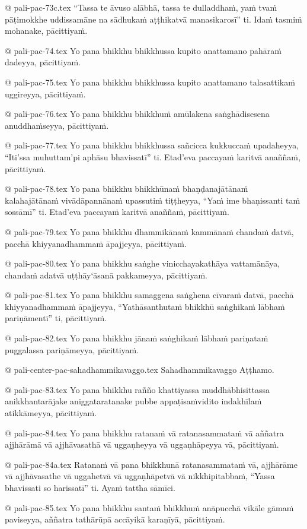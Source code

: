 @ pali-pac-73c.tex
“Tassa te āvuso alābhā, tassa te dulladdhaṁ, yaṁ tvaṁ pāṭimokkhe uddissamāne na sādhukaṁ aṭṭhikatvā manasikarosī” ti. Idaṁ tasmiṁ mohanake, pācittiyaṁ.

@ pali-pac-74.tex
Yo pana bhikkhu bhikkhussa kupito anattamano pahāraṁ dadeyya, pācittiyaṁ.

@ pali-pac-75.tex
Yo pana bhikkhu bhikkhussa kupito anattamano talasattikaṁ uggireyya, pācittiyaṁ.

@ pali-pac-76.tex
Yo pana bhikkhu bhikkhuṁ amūlakena saṅghādisesena anuddhaṁseyya, pācittiyaṁ.

@ pali-pac-77.tex
Yo pana bhikkhu bhikkhussa sañcicca kukkuccaṁ upadaheyya, “Iti’ssa muhuttam’pi aphāsu bhavissatī” ti. Etad’eva paccayaṁ karitvā anaññaṁ, pācittiyaṁ.

@ pali-pac-78.tex
Yo pana bhikkhu bhikkhūnaṁ bhaṇḍanajātānaṁ kalahajātānaṁ vivādāpannānaṁ upassutiṁ tiṭṭheyya, “Yaṁ ime bhaṇissanti taṁ sossāmī” ti. Etad’eva paccayaṁ karitvā anaññaṁ, pācittiyaṁ.

@ pali-pac-79.tex
Yo pana bhikkhu dhammikānaṁ kammānaṁ chandaṁ datvā, pacchā khiyyanadhammaṁ āpajjeyya, pācittiyaṁ.

@ pali-pac-80.tex
Yo pana bhikkhu saṅghe vinicchayakathāya vattamānāya, chandaṁ adatvā uṭṭhāy‘āsanā pakkameyya, pācittiyaṁ.

@ pali-pac-81.tex
Yo pana bhikkhu samaggena saṅghena cīvaraṁ datvā, pacchā khiyyanadhammaṁ āpajjeyya, “Yathāsanthutaṁ bhikkhū saṅghikaṁ lābhaṁ pariṇāmentī” ti, pācittiyaṁ.

@ pali-pac-82.tex
Yo pana bhikkhu jānaṁ saṅghikaṁ lābhaṁ pariṇataṁ puggalassa pariṇāmeyya, pācittiyaṁ.

@ pali-center-pac-sahadhammikavaggo.tex
Sahadhammikavaggo Aṭṭhamo.

@ pali-pac-83.tex
Yo pana bhikkhu rañño khattiyassa muddhābhisittassa anikkhantarājake aniggataratanake pubbe appaṭisaṁvidito indakhīlaṁ atikkāmeyya, pācittiyaṁ.

@ pali-pac-84.tex
Yo pana bhikkhu ratanaṁ vā ratanasammataṁ vā aññatra ajjhārāmā vā ajjhāvasathā vā uggaṇheyya vā uggaṇhāpeyya vā, pācittiyaṁ.

@ pali-pac-84a.tex
Ratanaṁ vā pana bhikkhunā ratanasammataṁ vā, ajjhārāme vā ajjhāvasathe vā uggahetvā vā uggaṇhāpetvā vā nikkhipitabbaṁ, “Yassa bhavissati so harissatī” ti. Ayaṁ tattha sāmīci.

@ pali-pac-85.tex
Yo pana bhikkhu santaṁ bhikkhuṁ anāpucchā vikāle gāmaṁ paviseyya, aññatra tathārūpā accāyikā karaṇīyā, pācittiyaṁ.

